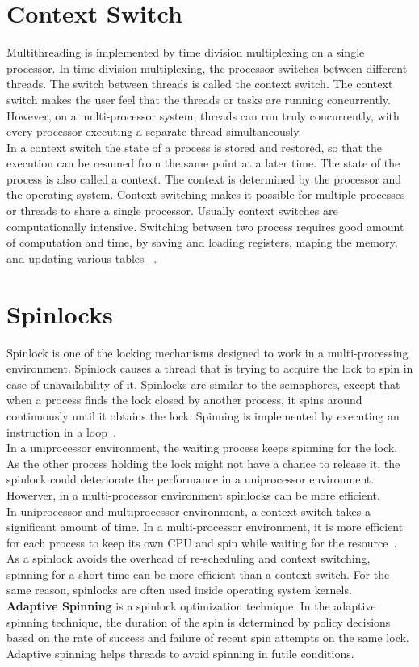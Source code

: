 \section{Context Switch}
Multithreading is implemented by time division multiplexing on a single processor. In time division multiplexing, the processor switches between different threads. The switch between threads is called the context switch. The context switch makes the user feel that the threads or tasks are running concurrently. However, on a multi-processor system, threads can run truly concurrently, with every processor executing a separate thread simultaneously. 
\\
In a context switch the state of a process is stored and restored, so that the execution can be resumed from the same point at a later time. The state of the process is also called a context. The context is determined by the processor and the operating system. Context switching makes it possible for multiple processes or threads to share a single processor. Usually context switches are computationally intensive. Switching between two process requires good amount of computation and time, by saving and loading registers, maping the memory, and updating various tables~\cite{Galvin} .

\section{Spinlocks}
Spinlock is one of the locking mechanisms designed to work in a multi-processing environment. Spinlock causes a thread that is trying to acquire the lock to spin in case of unavailability of it. Spinlocks are similar to the semaphores, except that when a process finds the lock closed by another process, it spins around continuously until it obtains the lock. Spinning is implemented by executing an instruction in a loop~\cite{Bovet:2005:ULK:1077084}.
\\[3mm]
In a uniprocessor environment, the waiting process keeps spinning for the lock. As the other process holding the lock might not have a chance to release it, the spinlock could deteriorate the performance in a uniprocessor environment. Howerver, in a multi-processor environment spinlocks can be more efficient. 
\\[3mm] 
In uniprocessor and multiprocessor environment, a context switch takes a significant amount of time. In a multi-processor environment, it is more efficient for each process to keep its own CPU and spin while waiting for the resource~\cite{Bovet:2005:ULK:1077084}. As a spinlock avoids the overhead of re-scheduling and context switching, spinning for a short time can be more efficient than a context switch. For the same reason, spinlocks are often used inside operating system kernels.
\\[3mm]
\textbf{Adaptive Spinning} is a spinlock optimization technique. In the adaptive spinning technique, the duration of the spin is determined by policy decisions based on the rate of success and failure of recent spin attempts on the same lock. Adaptive spinning helps threads to avoid spinning in futile conditions.

